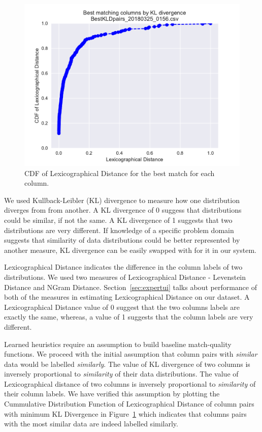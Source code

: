 \begin{figure}
	\centering
	\includegraphics[trim={0 6mm 0 0},clip,width=1\columnwidth]{graphics/CDF_LexDistance1}
	\caption{CDF of Lexicographical Distance for the best match for each column.}
	\label{fig:cdflexdist}
	\trimfigurespacing
\end{figure}

We used Kullback-Leibler (KL) divergence to measure how one distribution diverges from from another. A KL divergence of 0 suggess that distributions could be similar, if not the same. A KL divergence of 1 suggests that two distributions are very different. If knowledge of a specific problem domain suggests that similarity of data distributions could be better represented by another measure, KL divergence can be easily swapped with for it in our system.  

Lexicographical Distance indicates the difference in the column labels of two distributions. We used two measures of Lexicographical Distance - Levenstein Distance and NGram Distance. Section~\ref{sec:expertui} talks about performance of both of the measures in estimating Lexicographical Distance on our dataset. A Lexicographical Distance value of 0 suggest that the two columns labels are exactly the same, whereas, a value of 1 suggests that the column labels are very different.

Learned heuristics require an assumption to build baseline match-quality functions. We proceed with the initial assumption that column pairs with \textit{similar} data would be labelled \textit{similarly}. The value of KL divergence of two columns is inversely proportional to \textit{similarity} of their data distributions. The value of Lexicographical distance of two columns is inversely proportional to \textit{similarity} of their column labels. We have verified this assumption by plotting the Cummulative Distribution Function of Lexicographical Distance of column pairs with minimum KL Divergence in Figure~\ref{fig:cdflexdist} which indicates that columns pairs with the most similar data are indeed labelled similarly. 
 
